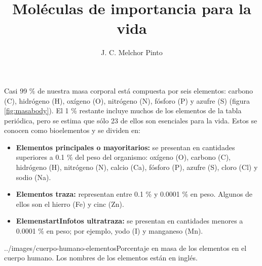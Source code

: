\documentclass[12pt]{guia}
\title{Moléculas de importancia para la vida  }
\author{J. C. Melchor Pinto}
\begin{document}
\pagestyle{headandfoot}
\addpoints
\INFO
\printanswers
\begin{startInfo}
    {
        Casi 99 \% de nuestra masa corporal está compuesta por seis elementos:
        carbono (C), hidrógeno (H), oxígeno (O), nitrógeno (N), fósforo
        (P) y azufre (S) (figura \ref{fig:masabody}). El 1  \% restante incluye muchos
        de los elementos de la tabla periódica, pero se estima que
        sólo 23 de ellos son esenciales para la vida. Estos se conocen
        como bioelementos y se dividen en:
        \begin{itemize}
            \item \textbf{Elementos principales o mayoritarios:} se presentan en cantidades superiores a 0.1 \% del peso del organismo: oxígeno (O),
                  carbono (C), hidrógeno (H), nitrógeno (N), calcio (Ca), fósforo
                  (P), azufre (S), cloro (Cl) y sodio (Na).
            \item \textbf{Elementos traza:} representan entre 0.1 \% y 0.0001 \% en peso.
                  Algunos de ellos son el hierro (Fe) y cinc (Zn).
            \item \textbf{ElemenstartInfotos ultratraza:} se presentan en cantidades menores a
                  0.0001 \% en peso; por ejemplo, yodo (I) y manganeso (Mn).
        \end{itemize}
    }{../images/cuerpo-humano-elementos}{Porcentaje en masa de los elementos
        en el cuerpo humano. Los nombres de los elementos están en inglés.}
\end{startInfo}
\end{document}
